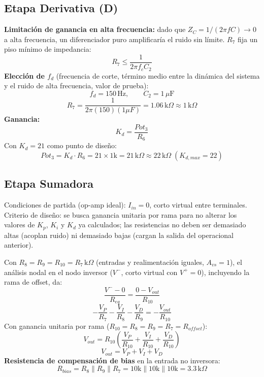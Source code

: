 \documentclass[conference]{IEEEtran}
\begin{document}
\subsection{Etapa Derivativa (D)}
\textbf{Limitación de ganancia en alta frecuencia:} dado que $Z_C=1/(2\pi f C)\to 0$ a alta frecuencia, un diferenciador puro amplificaría el ruido sin límite. $R_7$ fija un piso mínimo de impedancia:
\begin{equation}
R_7 \le \frac{1}{2\pi f_c C_2}
\end{equation}
\textbf{Elección de $f_d$} (frecuencia de corte, término medio entre la dinámica del sistema y el ruido de alta frecuencia, valor de prueba):
\begin{equation}
f_d = 150\,\text{Hz}, \qquad C_2 = 1\,\mu\text{F}
\end{equation}
\begin{equation}
R_7=\frac{1}{2\pi(150)(1\mu F)}=1.06\,\text{k}\Omega\approx\boxed{1\,\text{k}\Omega}
\end{equation}
\textbf{Ganancia:}
\begin{equation}
K_d=\frac{Pot_3}{R_6}
\end{equation}
Con $K_d=21$ como punto de diseño:
\begin{equation}
Pot_3=K_d\cdot R_6 = 21\times1\text{k}=21\,\text{k}\Omega\approx\boxed{22\,\text{k}\Omega} \;(K_{d,max}=22)
\end{equation}

\subsection{Etapa Sumadora}
Condiciones de partida (op-amp ideal): $I_{in}=0$, corto virtual entre terminales. Criterio de diseño: se busca ganancia unitaria por rama para no alterar los valores de $K_p$, $K_i$ y $K_d$ ya calculados; las resistencias no deben ser demasiado altas (acoplan ruido) ni demasiado bajas (cargan la salida del operacional anterior).

Con $R_8=R_9=R_{10}=R_{7}\,\text{k}\Omega$ (entradas y realimentación iguales, $A_{vs}=1$), el análisis nodal en el nodo inversor ($V^-$, corto virtual con $V^+=0$), incluyendo la rama de offset, da:
\begin{equation}
\frac{V^--0}{R_{eq}}=\frac{0-V_{out}}{R_{10}}
\end{equation}
\begin{equation}
-\frac{V_P}{R_7}-\frac{V_I}{R_8}-\frac{V_D}{R_{9}}=-\frac{V_{out}}{R_{10}}
\end{equation}
Con ganancia unitaria por rama ($R_{10}=R_8=R_9=R_{7}=R_{offset}$):
\begin{equation}
V_{out}=R_{10}\left(\frac{V_P}{R_{10}}+\frac{V_I}{R_{10}}+\frac{V_D}{R_{10}}\right)
\end{equation}
\begin{equation}
\boxed{V_{out}=V_P+V_I+V_D}
\end{equation}
\textbf{Resistencia de compensación de bias} en la entrada no inversora:
\begin{equation}
R_{bias}=R_8\parallel R_9\parallel R_{7} = 10\text{k}\parallel10\text{k}\parallel10\text{k}=
\boxed{3.3\,\text{k}\Omega}
\end{equation}
\end{document}

